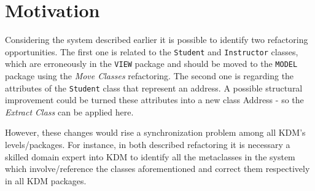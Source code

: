 \section{Motivation} %
\label{sec:motivation_and_running_example}


Considering the system described earlier it is possible to identify two refactoring opportunities. The first one is related to the \texttt{Student} and \texttt{Instructor} classes, which are erroneously in the \texttt{VIEW} package and should be moved to the \texttt{MODEL} package using the  \textit{Move Classes} refactoring. The second one is regarding the attributes of the \texttt{Student} class that represent an address. A possible structural improvement could be turned these attributes into a new class Address - so the \textit{Extract Class} can be applied here. 

%
%
%
%

However, these changes would rise a synchronization problem among all KDM's levels/packages. For instance, in both described refactoring it is necessary a skilled domain expert into KDM to identify all the metaclasses in the system which involve/reference the classes aforementioned and correct them respectively in all KDM packages.%


